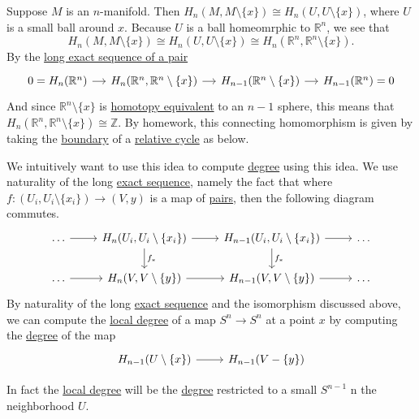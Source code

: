 \begin{answer}
	Suppose \(M\) is an \(n\)-manifold. Then \(H_n(M, M \setminus \{x\}) \cong H_n(U, U \setminus \{x\})\), where \(U\) is a small ball around \(x\). Because \(U\) is a ball homeomrphic to \(\mathbb{R} ^n\), we see that
	\[
		H_n(M, M \setminus \{x\}) \cong H_n(U, U \setminus \{x\}) \cong H_n(\mathbb{R} ^n, \mathbb{R} ^n \setminus \{x\}).
	\]
	By the \hyperref[thm:long-exact-sequence-of-a-pair]{long exact sequence of a pair}
	\[
		\begin{tikzcd}[column sep=small]
			{0=H_n(\mathbb{R}^n)} & {H_n(\mathbb{R}^n, \mathbb{R}^n\setminus\{x\})} & {H_{n-1}(\mathbb{R}^n\setminus\{x\})} & {H_{n-1}(\mathbb{R}^n)=0}
			\arrow[from=1-1, to=1-2]
			\arrow[from=1-2, to=1-3]
			\arrow[from=1-3, to=1-4]
		\end{tikzcd}
	\]
	And since \(\mathbb{R}^n \setminus \{x\}\) is \hyperref[def:homotopy-equivalence]{homotopy equivalent} to an \(n - 1\) sphere, this means that \(H_n(\mathbb{R} ^n, \mathbb{R} ^n \setminus \{x\}) \cong \mathbb{Z} \). By homework, this connecting homomorphism is given by taking the \hyperref[def:boundary]{boundary} of a \hyperref[def:relative-cycle]{relative cycle} as below.
	\begin{figure}[H]
		\centering
		\label{fig:connecting-homomorphism-relative-homology-rn}
	\end{figure}

	We intuitively want to use this idea to compute \hyperref[def:degree]{degree} using this idea. We use naturality of the long \hyperref[def:exact-sequence]{exact sequence}, namely the fact that where \(f \colon (U_i, U_i \setminus \{x_i\}) \to (V, y)\) is a map of \hyperref[def:good-pair]{pairs}, then the following diagram commutes.
	\[
		\begin{tikzcd}
			\dots & {H_n(U_i, U_i\setminus\{x_i\})} & {H_{n-1}(U_i, U_i\setminus\{x_i\})} & \dots \\
			\dots & {H_n(V, V\setminus\{y\})} & {H_{n-1}(V, V\setminus\{y\})} & \dots
			\arrow[from=1-1, to=1-2]
			\arrow[from=1-2, to=1-3]
			\arrow[from=1-3, to=1-4]
			\arrow["{f_\ast}", from=1-3, to=2-3]
			\arrow[from=2-3, to=2-4]
			\arrow[from=2-2, to=2-3]
			\arrow["{f_\ast}", from=1-2, to=2-2]
			\arrow[from=2-1, to=2-2]
		\end{tikzcd}
	\]
	By naturality of the long \hyperref[def:exact-sequence]{exact sequence} and the isomorphism discussed above, we can compute the \hyperref[def:local-degree]{local degree} of a map \(S^n \to S^n\) at a point \(x\) by computing the \hyperref[def:degree]{degree} of the map
	\[
		\begin{tikzcd}
			{H_{n-1}(U\setminus\{x\})} & {H_{n-1}(V-\{y\})}
			\arrow[from=1-1, to=1-2]
		\end{tikzcd}
	\]

	In fact the \hyperref[def:local-degree]{local degree} will be the \hyperref[def:degree]{degree} restricted to a small \(S^{n - 1}\) n the neighborhood \(U\).
	\begin{figure}[H]
		\centering
		\label{fig:computing-local-homology-idea}
	\end{figure}
\end{answer}

